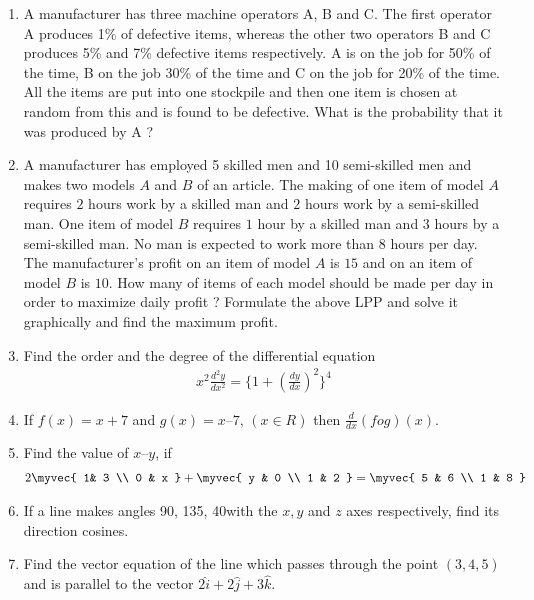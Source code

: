 \documentclass{article}
\begin{document}
\begin{enumerate}
\item A manufacturer has three machine operators A, B and C. The first operator A produces 1\% of defective items, whereas the other two operators B and C produces 5\% and 7\% defective items respectively. A is on the job for 50\% of the time, B on the job 30\% of the time and C on the job for 20\% of the time. All the items are put into one stockpile and then one item is chosen at random from this and is found to be defective. What is the probability that it was produced by A ?
\item A manufacturer has employed 5 skilled men and 10 semi-skilled men and makes two models $A$ and $B$ of an article. The making of one item of model $A$ requires $2$ hours work by a skilled man and $2$ hours work by a semi-skilled man. One item of model $B$ requires $1$ hour by a skilled man and $3$ hours by a semi-skilled man. No man is expected to work more than $8$ hours per day. The manufacturer’s profit on an item of model $A$ is \rupee $15$ and on an item of model $B$ is \rupee $10$. How many of items of each model should be made per day in order to maximize daily profit ? Formulate the above LPP and solve it graphically and find the maximum profit.
\item Find the order and the degree of the differential equation
\begin{align*}
x^{2}\frac{d^{2}y}{dx^{2}}=\{1+(\frac{dy}{dx})^{2}\}^{4}
\end{align*}
\item If $f(x) = x + 7$ and $g(x) = x – 7$, $(x\in R)$ then  $\frac{d}{dx}(fog)(x)$.
\item Find the value of $x – y$, if
\begin{align*}    
2\myvec{
    1& 3 \\
    0 & x }+
\myvec{         
    y & 0 \\
    1 & 2 }=
\myvec{ 
        5 & 6 \\
        1 & 8 }
\end{align*}
\item If a line makes angles 90\degree, 135\degree, 40\degree with the $x, y$ and $z$ axes respectively, find its direction cosines. 
\item Find the vector equation of the line which passes through the point $(3, 4, 5)$ and is 
parallel to the vector $2\hat{i}+2\hat{j}+3\hat{k}$.

\end{enumerate}
\end{document}
